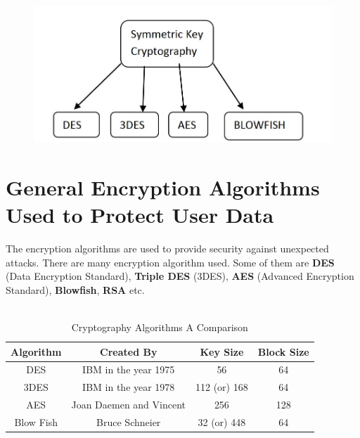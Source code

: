 \documentclass[12pt,a4paper,conference]{IEEEtran}
\begin{document}
\begin{figure}[h!]
  \includegraphics[width=\linewidth]{fig2.jpg}
\end{figure}


\section{General Encryption Algorithms Used to Protect User Data}


The encryption algorithms are used to provide security against unexpected attacks. There are many encryption algorithm used. Some of them are \textbf{DES} (Data Encryption Standard), \textbf{Triple DES} (3DES), \textbf{AES} (Advanced Encryption Standard), \textbf{Blowfish},  \textbf{RSA } etc.\\
\\

\begin{table}[h!]
  \begin{center}
    \caption{Cryptography Algorithms A Comparison}
    \label{tab:table1}
   \renewcommand{\arraystretch}{2.5}
    \begin{tabular}{|c|c|c|c|}
    \hline

      \textbf{Algorithm} & \textbf{Created By} & \textbf{Key Size}& \textbf{Block Size}\\
    
  \hline
   
   DES & IBM in the year 1975 & 56 & 64\\ 
  
\hline

3DES & IBM in the year 1978 & 112 (or) 168 & 64\\

\hline

AES & Joan Daemen and Vincent & 256 & 128\\

\hline

Blow Fish & Bruce Schneier & 32 (or) 448 & 64\\

\hline
    \end{tabular}
  \end{center}
\end{table}
\end{document}
